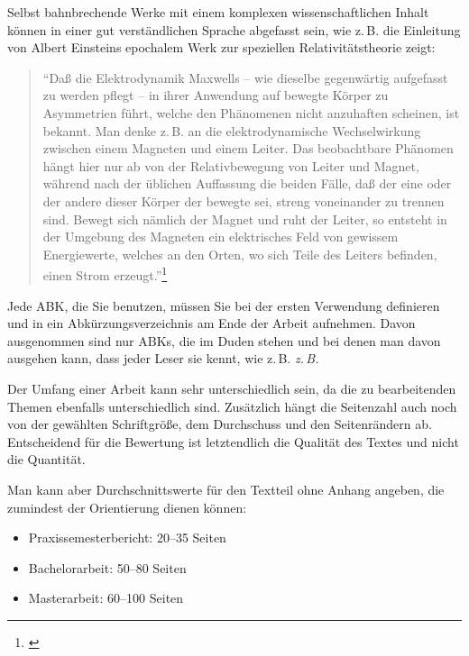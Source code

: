 \documentclass[a4paper,11pt,headings=normal]{scrartcl}
\begin{document}
Selbst bahnbrechende Werke mit einem komplexen wissenschaftlichen Inhalt können in einer gut verständlichen Sprache abgefasst sein, wie z.\,B. die Einleitung von Albert Einsteins epochalem Werk zur speziellen Relativitätstheorie zeigt:
\begin{quote}\begin{small}
"`Daß die Elektrodynamik Maxwells -- wie dieselbe gegenwärtig aufgefasst zu werden pflegt -- in ihrer Anwendung auf bewegte Körper zu Asymmetrien führt, welche den Phänomenen nicht anzuhaften scheinen, ist bekannt. Man denke z.\,B. an die elektrodynamische Wechselwirkung zwischen einem Magneten und einem Leiter. Das beobachtbare Phänomen hängt hier nur ab von der Relativbewegung von Leiter und Magnet, während nach der üblichen Auffassung die beiden Fälle, daß der eine oder der andere dieser Körper der bewegte sei, streng voneinander zu trennen sind. Bewegt sich nämlich der Magnet und ruht der Leiter, so entsteht in der Umgebung des Magneten ein elektrisches Feld von gewissem Energiewerte, welches an den Orten, wo sich Teile des Leiters befinden, einen Strom erzeugt."'\footnote{\autocite{Einstein1905}}
\end{small}\end{quote}

\noindent Jede \ac{ABK}, die Sie benutzen, müssen Sie bei der ersten Verwendung definieren und in ein Abkürzungsverzeichnis am Ende der Arbeit aufnehmen. Davon ausgenommen sind nur \acp{ABK}, die im Duden stehen und bei denen man davon ausgehen kann, dass jeder Leser sie kennt, wie z.\,B. \textit{z.\,B.}

Der Umfang einer Arbeit kann sehr unterschiedlich sein, da die zu bearbeitenden Themen ebenfalls unterschiedlich sind. Zusätzlich hängt die Seitenzahl auch noch von der gewählten Schriftgröße, dem Durchschuss und den Seitenrändern ab. Entscheidend für die Bewertung ist letztendlich die Qualität des Textes und nicht die Quantität.

Man kann aber Durchschnittswerte für den Textteil ohne Anhang angeben, die zumindest der Orientierung dienen können:

\begin{itemize}
\item Praxissemesterbericht: 20--35 Seiten
\item Bachelorarbeit: 50--80 Seiten
\item Masterarbeit: 60--100 Seiten
\end{itemize}
\end{document}
